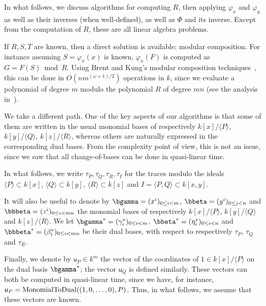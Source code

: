 \documentclass{sig-alternate}
\def\vu {\ensuremath{\mathsf{u}}}
\newcommand{\ang}[1]{\langle#1\rangle}
\newcommand{\dual}[1]{\overline{#1}}
\begin{document}
In what follows, we discuss algorithms for computing $R$, then
applying $\varphi_x$ and $\varphi_y$ as well as their inverses (when
well-defined), as well as $\Phi$ and its inverse. Except from the
computation of $R$, these are all linear algebra problems. 

If $R,S,T$ are known, then a direct solution is available: modular
composition. For instance assuming $S=\varphi_x(x)$ is known,
$\varphi_x(F)$ is computed as $G=F(S) \bmod R$. Using Brent and Kung's
modular composition techniques~\cite{brent+kung}, this can be done in
$O(n m^{(\omega+1)/2})$ operations in $k$, since we evaluate a
polynomial of degree $m$ modulo the polynomial $R$ of degree $mn$ (see
the analysis in~\cite{shoup94}).

We take a different path. One of the key aspects of our algorithms is
that some of them are written in the usual monomial bases of
respectively $k[x]/\ang{P}$, $k[y]/\ang{Q}$, $k[z]/\ang{R}$, whereas
others are naturally expressed in the corresponding dual bases. From
the complexity point of view, this is not an issue, since we saw that
all change-of-bases can be done in quasi-linear time.

In what follows, we write $\tau_P,\tau_Q,\tau_R,\tau_I$ for the traces
modulo the ideals $\ang{P}\subset k[x]$, $\ang{Q} \subset k[y]$,
$\ang{R} \subset k[z]$ and $I=\ang{P,Q} \subset k[x,y]$. 

It will also be useful to denote by $\bgamma=(x^i)_{0 \le i < m}$,
$\bbeta=(y^i)_{0 \le j < n}$ and $\bbbeta = (z^i)_{0 \le i < mn}$ the
monomial bases of respectively $k[x]/\ang{P}$, $k[y]/\ang{Q}$ and
$k[z]/\ang{R}$. We let $\bgamma^\ast=(\gamma^\ast_i)_{0 \le i <m}$,
$\bbeta^\ast=(\eta^\ast_i)_{0 \le i < n}$ and
$\bbbeta^\ast=(\beta^\ast_i)_{0 \le i < mn}$ be their dual bases, with
respect to respectively $\tau_P$, $\tau_Q$ and $\tau_R$.

Finally, we denote by $\vu_P \in k^m$ the vector of the coordinates of
$1 \in k[x]/\ang{P}$ on the dual basis $\bgamma^\ast$; the vector
$\vu_Q$ is defined similarly. These vectors can both be computed in
quasi-linear time, since we have, for instance, $\vu_P = {\rm
  MonomialToDual}((1,0,\dots,0), P)$. Thus, in what follows, we assume
that these vectors are known.
\end{document}
